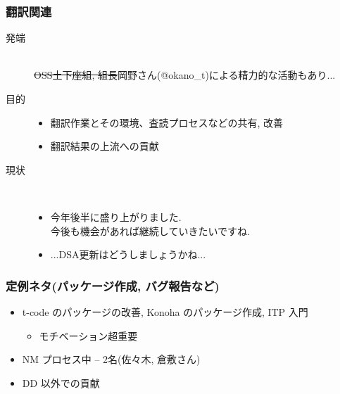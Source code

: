 \documentclass[cjk,dvipdfmx,10pt,compress,%
hyperref={bookmarks=true,bookmarksnumbered=true,bookmarksopen=false,%
colorlinks=false,%
pdftitle={第 67 回 関西 Debian 勉強会},%
pdfauthor={倉敷・のがた・佐々木・かわだ},%
pdfsubject={資料},%
}]{beamer}
\begin{document}
\begin{frame}
  \frametitle{翻訳関連}
  \begin{description}
  \item[発端] \mbox{~}\\
    \sout{OSS土下座組, 組長}岡野さん(@okano\_t)による精力的な活動もあり...
  \item[目的]
    \begin{itemize}
    \item 翻訳作業とその環境、査読プロセスなどの共有, 改善
    \item 翻訳結果の上流への貢献
    \end{itemize}
  \item[現状] \mbox{~}\\
    \begin{itemize}
    \item
      今年後半に盛り上がりました. \\
      今後も機会があれば継続していきたいですね.
    \item ...DSA更新はどうしましょうかね...
    \end{itemize}
  \end{description}
\end{frame}

\begin{frame}
  \frametitle{定例ネタ(パッケージ作成, バグ報告など)}
  \begin{itemize}
  \item
    t-code のパッケージの改善, Konoha のパッケージ作成, ITP 入門
    \begin{itemize}
    \item \alert{モチベーション超重要}
    \end{itemize}
  \item NM プロセス中 -- 2名(佐々木, 倉敷さん)
  \item DD 以外での貢献
  \end{itemize}
\end{frame}
\end{document}
